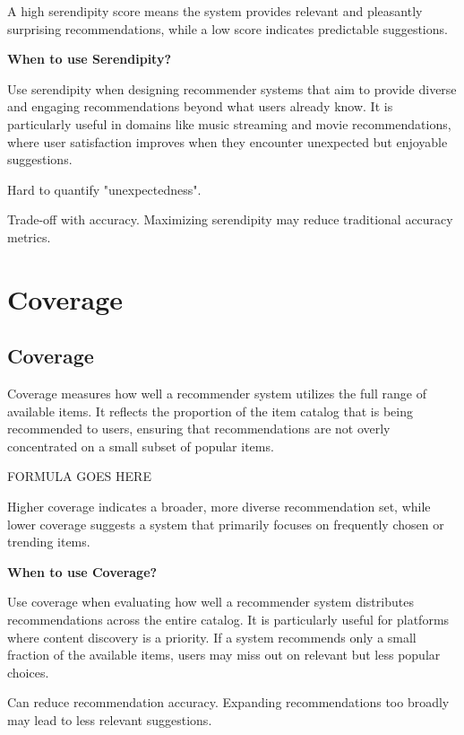 A high serendipity score means the system provides relevant and pleasantly surprising recommendations, while a low score
indicates predictable suggestions.

\textbf{When to use Serendipity?}

Use serendipity when designing recommender systems that aim to provide diverse and engaging recommendations beyond what
users already know. It is particularly useful in domains like music streaming and movie recommendations, where user
satisfaction improves when they encounter unexpected but enjoyable suggestions.

{
    \item Hard to quantify "unexpectedness".
    \item Trade-off with accuracy. Maximizing serendipity may reduce traditional accuracy metrics.
}


\clearpage
\thispagestyle{rankingstyle}
\section{Coverage}
\subsection{Coverage}

Coverage measures how well a recommender system utilizes the full range of available items. It reflects the proportion of
the item catalog that is being recommended to users, ensuring that recommendations are not overly concentrated on a small
subset of popular items. 

\begin{center}
    FORMULA GOES HERE
\end{center}

Higher coverage indicates a broader, more diverse recommendation set, while lower coverage suggests a system that primarily
focuses on frequently chosen or trending items.

\textbf{When to use Coverage?}

Use coverage when evaluating how well a recommender system distributes recommendations across the entire catalog. 
It is particularly useful for platforms where content discovery is a priority. If a system recommends only a small fraction
of the available items, users may miss out on relevant but less popular choices.

{
    \item Can reduce recommendation accuracy. Expanding recommendations too broadly may lead to less relevant suggestions.
}